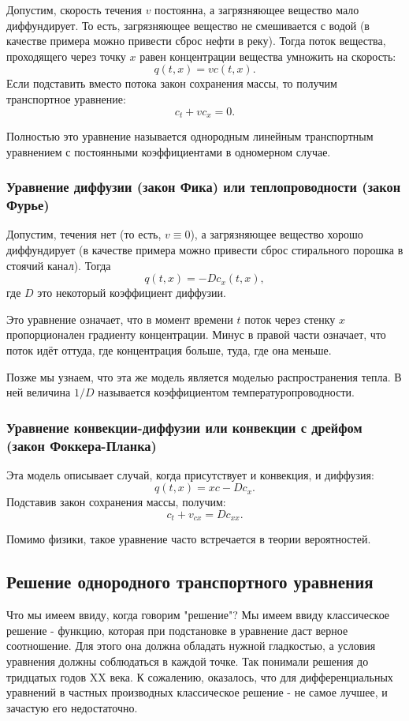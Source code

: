 Допустим, скорость течения $v$ постоянна, а загрязняющее вещество мало диффундирует. То есть, загрязняющее вещество не смешивается с водой (в качестве примера можно привести сброс нефти в реку). Тогда поток вещества, проходящего через точку $x$ равен концентрации вещества умножить на скорость:
$$ q (t, x) = v c (t, x). $$
Если подставить вместо потока закон сохранения массы, то получим транспортное уравнение:
$$ c_t + v c_x = 0.$$

Полностью это уравнение называется однородным линейным транспортным уравнением с постоянными коэффициентами в одномерном случае.

\subsubsection*{Уравнение диффузии (закон Фика) или теплопроводности (закон Фурье)}

Допустим, течения нет (то есть, $ v \equiv 0 $), а загрязняющее вещество хорошо диффундирует (в качестве примера можно привести сброс стирального порошка в стоячий канал). Тогда
$$ q (t, x) = - D c_x (t, x), $$
где $D$ это некоторый коэффициент диффузии.

Это уравнение означает, что в момент времени $t$ поток через стенку $x$ пропорционален градиенту концентрации. Минус в правой части означает, что поток идёт оттуда, где концентрация больше, туда, где она меньше.

Позже мы узнаем, что эта же модель является моделью распространения тепла. В ней величина $1/D$ называется коэффициентом температуропроводности.

\subsubsection*{Уравнение конвекции-диффузии или конвекции с дрейфом (закон Фоккера-Планка)}
Эта модель описывает случай, когда присутствует и конвекция, и диффузия:
$$ q (t, x)  = x c - D c_x. $$
Подставив закон сохранения массы, получим:
$$ c_t + v_{cx} = D c_{xx}. $$

Помимо физики, такое уравнение часто встречается в теории вероятностей.

\subsection{Решение однородного транспортного уравнения}
Что мы имеем ввиду, когда говорим "решение"? Мы имеем ввиду классическое решение - функцию, которая при подстановке в уравнение даст верное соотношение. Для этого она должна обладать нужной гладкостью, а условия уравнения должны соблюдаться в каждой точке. Так понимали решения до тридцатых годов XX века. К сожалению, оказалось, что для дифференциальных уравнений в частных производных классическое решение - не самое лучшее, и зачастую его недостаточно.

